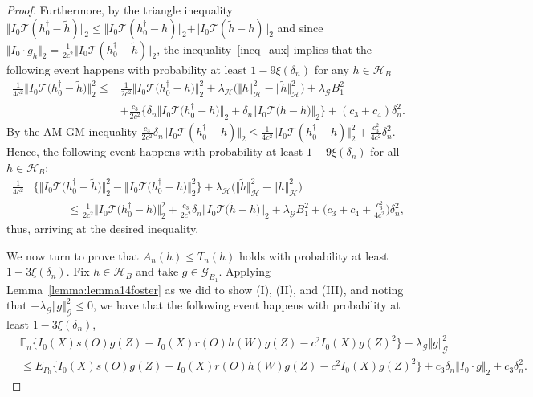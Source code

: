 \documentclass[twoside,11pt]{article}
\newcommand{\E}{\mathbb{E}}
\newcommand{\mc}{\mathcal}
\begin{document}
\begin{proof}
Furthermore, by the triangle inequality $\Vert I_0\mc{T}(h_0^\dag-\tilde h)\Vert_2\le \Vert I_0\mc{T}(h_0^\dag-h)\Vert_2+\Vert I_0\mc{T}(\tilde h-h)\Vert_2$ and since $\Vert I_0\cdot g_{\tilde h}\Vert_2=\frac{1}{2c^2}\Vert I_0\mc{T}(h_0^\dag-\tilde h)\Vert_2$, the inequality~\eqref{ineq_aux} implies that the following event happens with probability at least $1-9\xi(\delta_n)$ for any $h\in\mc{H}_B$
\begin{align*}
     \frac{1}{4c^2}\big\Vert I_0\mc{T}\big(h_0^\dag-\tilde h\big)\big\Vert^2_2\le&\frac{1}{2c^2}\big\Vert I_0\mc{T}\big(h_0^\dag-h\big)\big\Vert^2_2+\lambda_{\mc{H}}\Big(\big\Vert h\big\Vert_{\mc{H}}^2-\big\Vert \tilde h\big\Vert_{\mc{H}}^2\Big)+\lambda_{\mc{G}}B_1^2\\
    &+\frac{c_3}{2c^2}\Big\{\delta_n\big\Vert I_0\mc{T}\big(h_0^\dag-h\big)\big\Vert_2+\delta_n\big\Vert I_0\mc{T}\big(\tilde h-h\big)\big\Vert_2\Big\}+(c_3+c_4)\delta_n^2.
\end{align*}
By the AM-GM inequality $\frac{c_3}{2c^2}\delta_n \Vert I_0\mc{T}(h_0^\dag-h)\Vert_2\le\frac{1}{4c^2}\Vert I_0\mc{T}(h_0^\dag-h)\Vert_2^2+\frac{c_3^2}{4c^2}\delta_n^2$. Hence, the following event happens with probability at least $1-9\xi(\delta_n)$ for all $h\in\mc{H}_B$:
\begin{align*}
    \frac{1}{4c^2}&\Big\{\big\Vert I_0\mc{T}\big(h_0^\dag-\tilde h\big)\big\Vert^2_2-\big\Vert I_0\mc{T}\big(h_0^\dag-h\big)\big\Vert^2_2\Big\}+\lambda_{\mc{H}}\Big(\big\Vert \tilde h\big\Vert_{\mc{H}}^2-\big\Vert h\big\Vert_{\mc{H}}^2\Big)\\
    &\quad\quad\quad\le \frac{1}{2c^2}\big\Vert I_0\mc{T}\big(h_0^\dag-h\big)\big\Vert^2_2+\frac{c_3}{2c^2}\delta_n\big\Vert I_0\mc{T}\big(\tilde h-h\big)\big\Vert_2+\lambda_{\mc{G}}B_1^2+\Big(c_3+c_4+\frac{c_3^2}{4c^2}\Big)\delta^2_n,
\end{align*}
thus, arriving at the desired inequality.

We now turn to prove that $A_n(h)\le T_n(h)$ holds with probability at least $1-3\xi(\delta_n)$. Fix $h\in\mc{H}_B$ and take $g\in\mc{G}_{B_1}$. Applying Lemma~\ref{lemma:lemma14foster} as we did to show (I), (II), and (III), and noting that $-\lambda_{\mathcal{G}}\Vert g\Vert_{\mathcal{G}}^2\le0$, we have that the following event happens with probability at least $1-3\xi(\delta_n)$, 
\begin{align}
&\E_n\big\{I_0(X)s(O)g(Z)-I_0(X)r(O)h(W)g(Z)-c^2I_0(X)g(Z)^2\big\}-\lambda_{\mathcal{G}}\Vert g\Vert_{\mathcal{G}}^2\label{eq:bound_case1}\\
    &\le E_{P_0}\big\{I_0(X)s(O)g(Z)-I_0(X)r(O)h(W)g(Z)-c^2I_0(X) g(Z)^2\big\}+c_3\delta_n\Vert I_0\cdot  g\Vert_2+c_3\delta_n^2.\nonumber
\end{align}


\end{proof}
\end{document}
